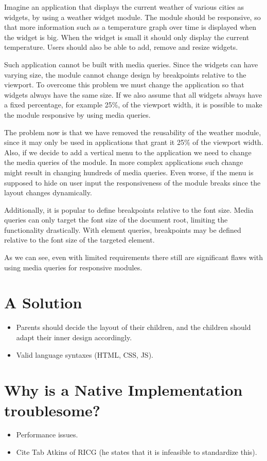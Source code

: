 \documentclass{sigchi}
\begin{document}
  Imagine an application that displays the current weather of various cities as widgets, by using a weather widget module.
  The module should be responsive, so that more information such as a temperature graph over time is displayed when the widget is big.
  When the widget is small it should only display the current temperature.
  Users should also be able to add, remove and resize widgets.

  Such application cannot be built with media queries.
  Since the widgets can have varying size, the module cannot change design by breakpoints relative to the viewport.
  To overcome this problem we must change the application so that widgets always have the same size.
  If we also assume that all widgets always have a fixed percentage, for example 25\%, of the viewport width, it is possible to make the module responsive by using media queries.

  The problem now is that we have removed the reusability of the weather module, since it may only be used in applications that grant it 25\% of the viewport width.
  Also, if we decide to add a vertical menu to the application we need to change the media queries of the module.
  In more complex applications such change might result in changing hundreds of media queries.
  Even worse, if the menu is supposed to hide on user input the responsiveness of the module breaks since the layout changes dynamically.

  Additionally, it is popular to define breakpoints relative to the font size.
  Media queries can only target the font size of the document root, limiting the functionality drastically.
  With element queries, breakpoints may be defined relative to the font size of the targeted element.

  As we can see, even with limited requirements there still are significant flaws with using media queries for responsive modules.

\section{A Solution}
  \begin{itemize}
    \item Parents should decide the layout of their children, and the children should adapt their inner design accordingly.
    \item Valid language syntaxes (HTML, CSS, JS).
  \end{itemize}

\section{Why is a Native Implementation troublesome?}
  \begin{itemize}
    \item Performance issues.
    \item Cite Tab Atkins of RICG (he states that it is infeasible to standardize this).
  \end{itemize}
\end{document}
